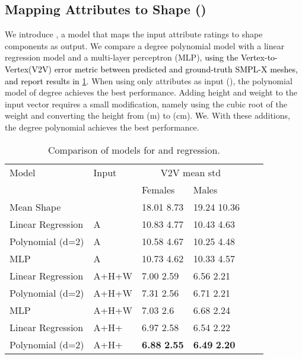 \documentclass[10pt,twocolumn,letterpaper]{article}
\newcommand{\AtoS}{\text{\mbox{A2S}}\xspace}
\newcommand{\AHWtoS}{\text{\mbox{AHW2S}}\xspace}
\newcommand{\smplx}{\mbox{SMPL-X}\xspace}
\newcommand{\vtov}{\mbox{V2V}\xspace}
\newcommand{\vtovlong}{Vertex-to-Vertex\xspace}
\newcommand{\cameraready}[1]{\textcolor{Fuchsia}{{#1}}\xspace}
\renewcommand{\cameraready}[1]{\textcolor{black}{{#1}}\xspace}
\begin{document}
\begin{appendices}
  \subsection{Mapping Attributes to Shape (\AtoS)}
We introduce \AtoS, a model that maps the input attribute ratings to shape components  as output.
We compare
a  degree polynomial model
with a linear regression model and a multi-layer perceptron (MLP),
\cameraready{using the \vtovlong (\vtov)
    error metric between predicted and ground-truth \smplx meshes,
    and report results in \cref{tab:AtoS_Comparison_Models}.
} When using only
attributes as input (\AtoS),
the polynomial model of degree  achieves the best performance.
Adding height and weight to the input vector requires a small modification,
namely using the cubic root of the weight and converting the height from (m) to (cm).
\cameraready{We}.
With these additions,
the  degree polynomial achieves the best performance.
\begin{table}
\renewcommand{\arraystretch}{1.2} 
\centering
\scriptsize
\begin{tabular}{llllll}
    \toprule
    Model             & Input                           & \multicolumn{2}{c}{\vtov mean  std}  \\
                      &                                 & Females              & Males                       \\
    \midrule
    Mean Shape        &                                & 18.01             8.73            & 19.24             10.36           \\ 
    Linear Regression & A                               & 10.83             4.77            & 10.43             4.63            \\
    Polynomial (d=2)  & A                               & 10.58    4.67            & 10.25    4.48   \\
    MLP             & A                               & 10.73             4.62   & 10.33             4.57            \\ 
    \midrule
    Linear Regression & A+H+W                             & 7.00              2.59            & 6.56              2.21   \\
    Polynomial (d=2)  & A+H+W                             & 7.31              2.56            & 6.71              2.21            \\
    MLP             & A+H+W                             & 7.03              2.6             & 6.68              2.24            \\
    Linear Regression & A+H+                         & 6.97              2.58            & 6.54              2.22            \\
    Polynomial (d=2)  & A+H+                          & \textbf{6.88}     \textbf{2.55}   & \textbf{6.49}     \textbf{2.20}   \\
    \bottomrule
\end{tabular}
\caption{Comparison of models for \AtoS and  \AHWtoS regression.}
\label{tab:AtoS_Comparison_Models}
\end{table}

\end{appendices}
\end{document}
